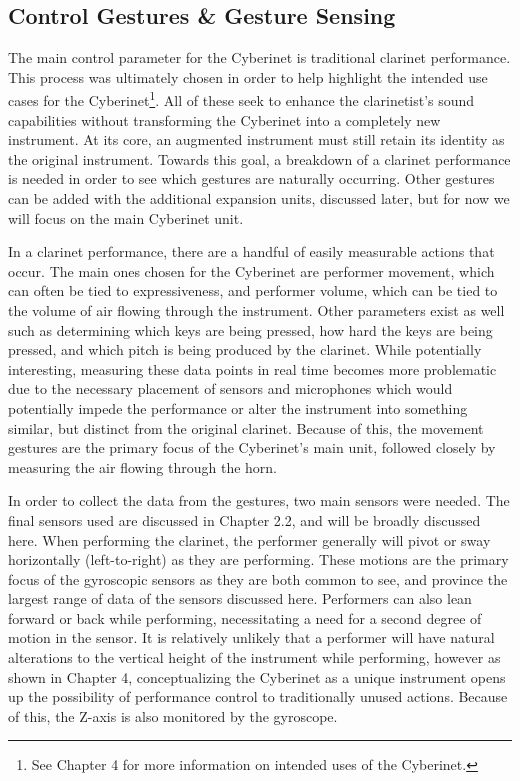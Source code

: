 \subsection{Control Gestures \& Gesture Sensing}
The main control parameter for the Cyberinet is traditional clarinet performance. This process was ultimately chosen in order to help highlight the intended use cases for the Cyberinet\footnote{See Chapter 4 for more information on intended uses of the Cyberinet.}. All of these seek to enhance the clarinetist's sound capabilities without transforming the Cyberinet into a completely new instrument. At its core, an augmented instrument must still retain its identity as the original instrument\cite{miranda_Wanderley_instrumentControl_2006}. Towards this goal, a breakdown of a clarinet performance is needed in order to see which gestures are naturally occurring. Other gestures can be added with the additional expansion units, discussed later, but for now we will focus on the main Cyberinet unit.

In a clarinet performance, there are a handful of easily measurable actions that occur. The main ones chosen for the Cyberinet are performer movement, which can often be tied to expressiveness, and performer volume, which can be tied to the volume of air flowing through the instrument. Other parameters exist as well such as determining which keys are being pressed, how hard the keys are being pressed, and which pitch is being produced by the clarinet. While potentially interesting, measuring these data points in real time becomes more problematic due to the necessary placement of sensors and microphones which would potentially impede the performance or alter the instrument into something similar, but distinct from the original clarinet. Because of this, the movement gestures  are the primary focus of the Cyberinet's main unit, followed closely by measuring the air flowing through the horn.

In order to collect the data from the gestures, two main sensors were needed. The final sensors used are discussed in Chapter 2.2, and will be broadly discussed here. When performing the clarinet, the performer generally will pivot or sway horizontally (left-to-right) as they are performing. These motions are the primary focus of the gyroscopic sensors as they are both common to see, and province the largest range of data of the sensors discussed here. Performers can also lean forward or back while performing, necessitating a need for a second degree of motion in the sensor. It is relatively unlikely that a performer will have natural alterations to the vertical height of the instrument while performing, however as shown in Chapter 4, conceptualizing the Cyberinet as a unique instrument opens up the possibility of performance control to traditionally unused actions. Because of this, the Z-axis is also monitored by the gyroscope.

